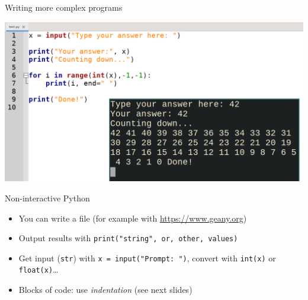\documentclass[11pt]{beamer}
\begin{document}
\begin{frame}{Writing more complex programs}
  \begin{center}\includegraphics[scale=0.25]{img/geany.png}\end{center}
\end{frame}

\begin{frame}{Non-interactive Python}
  \begin{itemize}
    \item You can write a file (for example with \url{https://www.geany.org})
    \item Output results with \texttt{print("string", or, other, values)}
    \item Get input (\texttt{str}) with \texttt{x = input("Prompt: ")},
          convert with \texttt{int(x)} or \texttt{float(x)}\dots
    \item Blocks of code: use \emph{indentation} (see next slides)
  \end{itemize}
\end{frame}
\end{document}
